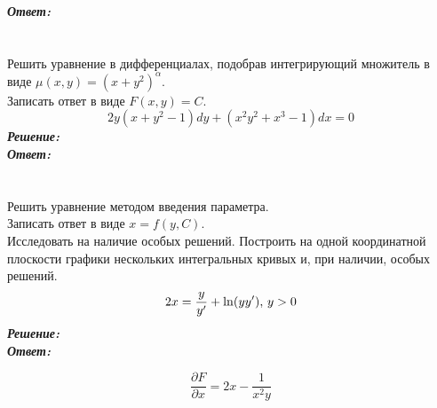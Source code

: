 \documentclass[a5paper, 10pt]{article}
\theoremstyle{definition}
\theoremstyle{plain}
\theoremstyle{remark}
\begin{document}
\textit{\textbf{Ответ:}}


\newpage
\section{}
Решить уравнение в дифференциалах, подобрав интегрирующий множитель в виде $\mu (x, y) = (x+y^2)^{\alpha}$.\\
Записать ответ в виде $F(x, y) = C$.
\begin{equation*}
2y(x + y^2 - 1) dy + (x^2y^2+x^3 - 1)dx = 0
\end{equation*}
\textit{\textbf{Решение:}}\\


\textit{\textbf{Ответ:}}

\newpage
\section{}
Решить уравнение методом введения параметра. \\
Записать ответ в виде $x = f(y, C)$.\\
Исследовать на наличие особых решений. Построить на одной координатной плоскости графики нескольких интегральных кривых и, при наличии, особых решений.
\begin{equation*}
2x = \frac{y}{y'} + \ln (yy'), \, y >0\\
\end{equation*}
\textit{\textbf{Решение:}}\\


\textit{\textbf{Ответ:}}


\begin{equation*}
\frac{\partial F}{\partial x} =  2x - \frac{1}{x^2y}
\end{equation*}
\end{document}
